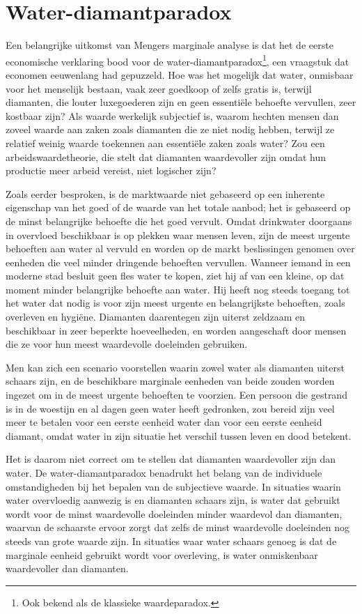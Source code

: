 \section{Water-diamantparadox}

Een belangrijke uitkomst van Mengers marginale analyse is dat het de eerste economische verklaring bood voor de water-diamantparadox\footnote{Ook bekend als de klassieke waardeparadox.}, een vraagstuk dat economen eeuwenlang had gepuzzeld. Hoe was het mogelijk dat water, onmisbaar voor het menselijk bestaan, vaak zeer goedkoop of zelfs gratis is, terwijl diamanten, die louter luxegoederen zijn en geen essentiële behoefte vervullen, zeer kostbaar zijn? Als waarde werkelijk subjectief is, waarom hechten mensen dan zoveel waarde aan zaken zoals diamanten die ze niet nodig hebben, terwijl ze relatief weinig waarde toekennen aan essentiële zaken zoals water? Zou een arbeidswaardetheorie, die stelt dat diamanten waardevoller zijn omdat hun productie meer arbeid vereist, niet logischer zijn?

Zoals eerder besproken, is de marktwaarde niet gebaseerd op een inherente eigenschap van het goed of de waarde van het totale aanbod; het is gebaseerd op de minst belangrijke behoefte die het goed vervult. Omdat drinkwater doorgaans in overvloed beschikbaar is op plekken waar mensen leven, zijn de meest urgente behoeften aan water al vervuld en worden op de markt beslissingen genomen over eenheden die veel minder dringende behoeften vervullen. Wanneer iemand in een moderne stad besluit geen fles water te kopen, ziet hij af van een kleine, op dat moment minder belangrijke behoefte aan water. Hij heeft nog steeds toegang tot het water dat nodig is voor zijn meest urgente en belangrijkste behoeften, zoals overleven en hygiëne. Diamanten daarentegen zijn uiterst zeldzaam en beschikbaar in zeer beperkte hoeveelheden, en worden aangeschaft door mensen die ze voor hun meest waardevolle doeleinden gebruiken.

Men kan zich een scenario voorstellen waarin zowel water als diamanten uiterst schaars zijn, en de beschikbare marginale eenheden van beide zouden worden ingezet om in de meest urgente behoeften te voorzien. Een persoon die gestrand is in de woestijn en al dagen geen water heeft gedronken, zou bereid zijn veel meer te betalen voor een eerste eenheid water dan voor een eerste eenheid diamant, omdat water in zijn situatie het verschil tussen leven en dood betekent.

Het is daarom niet correct om te stellen dat diamanten waardevoller zijn dan water. De water-diamantparadox benadrukt het belang van de individuele omstandigheden bij het bepalen van de subjectieve waarde. In situaties waarin water overvloedig aanwezig is en diamanten schaars zijn, is water dat gebruikt wordt voor de minst waardevolle doeleinden minder waardevol dan diamanten, waarvan de schaarste ervoor zorgt dat zelfs de minst waardevolle doeleinden nog steeds van grote waarde zijn. In situaties waar water schaars genoeg is dat de marginale eenheid gebruikt wordt voor overleving, is water onmiskenbaar waardevoller dan diamanten.
